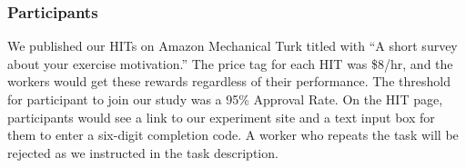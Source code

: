 \subsubsection{Participants}
We published our HITs on Amazon Mechanical Turk titled with ``A short survey about your exercise motivation.'' The price tag for each HIT was \$8/hr, and the workers would get these rewards regardless of their performance. The threshold for participant to join our study was a 95\% Approval Rate. On the HIT page, participants would see a link to our experiment site and a text input box for them to enter a six-digit completion code. A worker who repeats the task will be rejected as we instructed in the task description.
